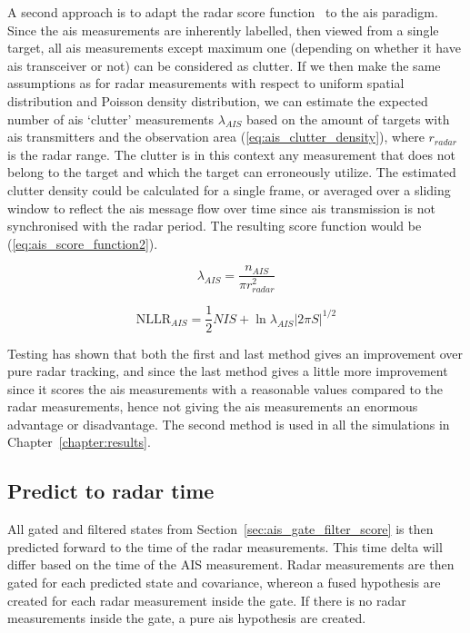 A second approach is to adapt the radar score function~\cite{Bar-Shalom2007} to the \gls{ais} paradigm. Since the \gls{ais} measurements are inherently labelled, then viewed from a single target, all \gls{ais} measurements except maximum one (depending on whether it have \gls{ais} transceiver or not) can be considered as clutter. If we then make the same assumptions as for radar measurements with respect to uniform spatial distribution and Poisson density distribution, we can estimate the expected number of \gls{ais} `clutter' measurements \( \lambda_{AIS} \) based on the amount of targets with \gls{ais} transmitters and the observation area (\ref{eq:ais_clutter_density}), where \(r_{radar}\) is the radar range. The clutter is in this context any measurement that does not belong to the target and which the target can erroneously utilize. The estimated clutter density could be calculated for a single frame, or averaged over a sliding window to reflect the \gls{ais} message flow over time since \gls{ais} transmission is not synchronised with the radar period. The resulting score function would be (\ref{eq:ais_score_function2}).

\begin{equation}\label{eq:ais_clutter_density}
\lambda_{AIS} = \frac{n_{AIS}}{\pi r_{radar}^2}
\end{equation}

\begin{equation}\label{eq:ais_score_function2}
\mathrm{NLLR}_{AIS} = \frac{1}{2} NIS + \ln \lambda_{AIS} |2 \pi S|^{1/2} 
\end{equation}

Testing has shown that both the first and last method gives an improvement over pure radar tracking, and since the last method gives a little more improvement since it scores the \gls{ais} measurements with a reasonable values compared to the radar measurements, hence not giving the \gls{ais} measurements an enormous advantage or disadvantage. The second method is used in all the simulations in Chapter~\ref{chapter:results}.

\subsection{Predict to radar time}
All gated and filtered states from Section~\ref{sec:ais_gate_filter_score} is then predicted forward to the time of the radar measurements. This time delta will differ based on the time of the AIS measurement. Radar measurements are then gated for each predicted state and covariance, whereon a fused hypothesis are created for each radar measurement inside the gate. If there is no radar measurements inside the \gls{gate}, a pure \gls{ais} hypothesis are created. 

